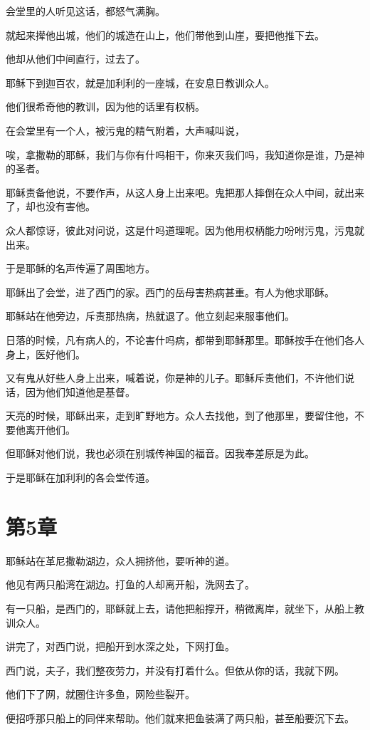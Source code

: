 \documentclass[12pt,oneside]{book}
\begin{document}
会堂里的人听见这话，都怒气满胸。

就起来撵他出城，他们的城造在山上，他们带他到山崖，要把他推下去。

他却从他们中间直行，过去了。

耶稣下到迦百农，就是加利利的一座城，在安息日教训众人。

他们很希奇他的教训，因为他的话里有权柄。

在会堂里有一个人，被污鬼的精气附着，大声喊叫说，

唉，拿撒勒的耶稣，我们与你有什吗相干，你来灭我们吗，我知道你是谁，乃是神的圣者。

耶稣责备他说，不要作声，从这人身上出来吧。鬼把那人摔倒在众人中间，就出来了，却也没有害他。

众人都惊讶，彼此对问说，这是什吗道理呢。因为他用权柄能力吩咐污鬼，污鬼就出来。

于是耶稣的名声传遍了周围地方。

耶稣出了会堂，进了西门的家。西门的岳母害热病甚重。有人为他求耶稣。

耶稣站在他旁边，斥责那热病，热就退了。他立刻起来服事他们。

日落的时候，凡有病人的，不论害什吗病，都带到耶稣那里。耶稣按手在他们各人身上，医好他们。

又有鬼从好些人身上出来，喊着说，你是神的儿子。耶稣斥责他们，不许他们说话，因为他们知道他是基督。

天亮的时候，耶稣出来，走到旷野地方。众人去找他，到了他那里，要留住他，不要他离开他们。

但耶稣对他们说，我也必须在别城传神国的福音。因我奉差原是为此。

于是耶稣在加利利的各会堂传道。

\chapter{第5章}
耶稣站在革尼撒勒湖边，众人拥挤他，要听神的道。

他见有两只船湾在湖边。打鱼的人却离开船，洗网去了。

有一只船，是西门的，耶稣就上去，请他把船撑开，稍微离岸，就坐下，从船上教训众人。

讲完了，对西门说，把船开到水深之处，下网打鱼。

西门说，夫子，我们整夜劳力，并没有打着什么。但依从你的话，我就下网。

他们下了网，就圈住许多鱼，网险些裂开。

便招呼那只船上的同伴来帮助。他们就来把鱼装满了两只船，甚至船要沉下去。
\end{document}
